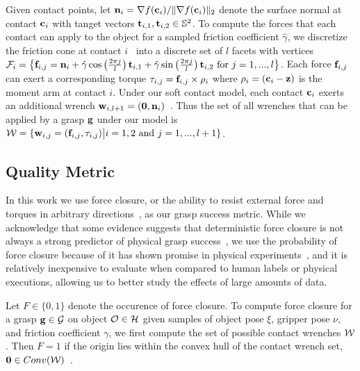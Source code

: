 Given contact points, let $\mathbf{n}_i = \nabla f(\mathbf{c}_i) / \| \nabla f(\mathbf{c}_i) \|_2$ denote the surface normal at contact $\mathbf{c}_i$ with tanget vectors $\mathbf{t}_{i,1}, \mathbf{t}_{i,2} \in \mathbb{S}^2$.
To compute the forces that each contact can apply to the object for a sampled friction coefficient $\hat{\gamma}$, we discretize the friction cone at contact $i$~\cite{pokorny2013classical} into a discrete set of $l$ facets with vertices $\mathcal{F}_{i} = \left\{ \mathbf{f}_{i,j} = \mathbf{n}_i + \hat{\gamma} \cos \left( \frac{2 \pi j}{l} \right) \mathbf{t}_{i,1} + \hat{\gamma} \sin \left( \frac{2 \pi j}{l} \right) \mathbf{t}_{i,2} \text{ for } j = 1, ..., l \right\}$.
Each force $\mathbf{f}_{i,j}$ can exert a corresponding torque $\tau_{i,j} = \mathbf{f}_{i,j} \times \rho_i$ where $\rho_i = (\mathbf{c}_i - \mathbf{z})$ is the moment arm at contact $i$.
Under our soft contact model, each contact $\mathbf{c}_i$ exerts an additional wrench $\mathbf{w}_{i,l+1} = (\mathbf{0}, \mathbf{n}_i)$~\cite{zheng2005}.
Thus the set of all wrenches that can be applied by a grasp $\mathbf{g}$ under our model is $\mathcal{W} = \{ \mathbf{w}_{i,j} = (\mathbf{f}_{i,j}, \tau_{i,j}) \big| i = 1, 2 \text{ and } j = 1, ..., l+1\}$.

\subsection{Quality Metric}
In this work we use force closure, or the ability to resist external force and torques in arbitrary directions~\cite{ferrari1992}, as our grasp success metric.
While we acknowledge that some evidence suggests that deterministic force closure is not always a strong predictor of physical grasp success~\cite{balasubramanian2012physical, diankov2010automated}, we use the probability of force closure because of it has shown promise in physical experiments~\cite{kim2012physically, weisz2012pose}, and it is relatively inexpensive to evaluate when compared to human labels or physical executions, allowing us to better study the effects of large amounts of data.

Let $F \in \{0, 1\}$ denote the occurence of force closure.
To compute force closure for a grasp $\mathbf{g} \in \mathcal{G}$ on object $\mathcal{O} \in \mathcal{H}$ given samples of object pose $\xi$, gripper pose $\nu$, and friction coefficient $\gamma$, we first compute the set of possible contact wrenches $\mathcal{W}$.
Then $F = 1$ if the origin lies within the convex hull of the contact wrench set, $\mathbf{0} \in Conv(\mathcal{W})$~\cite{weisz2012pose}.
%

